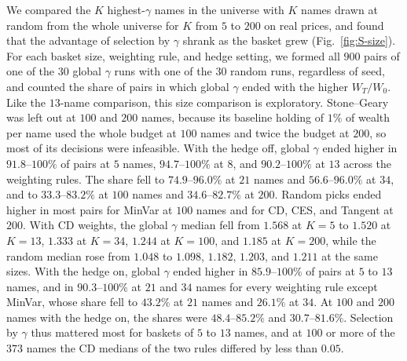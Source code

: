 We compared the $K$ highest-$\gamma$ names in the universe with $K$ names drawn at random from the whole universe
for $K$ from $5$ to $200$ on real prices, and found that the advantage of selection by $\gamma$ shrank as the basket
grew (Fig.~\ref{fig:S-size}). For each basket size, weighting rule, and hedge setting, we formed all $900$ pairs of
one of the $30$ global $\gamma$ runs with one of the $30$ random runs, regardless of seed, and counted the share of
pairs in which global $\gamma$ ended with the higher $W_T/W_0$. Like the $13$-name comparison, this size comparison
is exploratory.
Stone--Geary was left out at $100$ and $200$ names, because its baseline holding of $1\%$ of wealth per name used the
whole budget at $100$ names and twice the budget at $200$, so most of its decisions were infeasible.
With the hedge off, global $\gamma$ ended higher in $91.8$--$100\%$ of pairs at $5$ names, $94.7$--$100\%$ at $8$, and
$90.2$--$100\%$ at $13$ across the weighting rules. The share fell to $74.9$--$96.0\%$ at $21$ names and
$56.6$--$96.0\%$ at $34$, and to $33.3$--$83.2\%$ at $100$ names and $34.6$--$82.7\%$ at $200$. Random picks ended
higher in most pairs for MinVar at $100$ names and for CD, CES, and Tangent at $200$.
With CD weights, the global $\gamma$ median fell from $1.568$ at $K = 5$ to $1.520$ at $K = 13$, $1.333$ at
$K = 34$, $1.244$ at $K = 100$, and $1.185$ at $K = 200$, while the random median rose from $1.048$ to $1.098$,
$1.182$, $1.203$, and $1.211$ at the same sizes.
With the hedge on, global $\gamma$ ended higher in $85.9$--$100\%$ of pairs at $5$ to $13$ names, and in
$90.3$--$100\%$ at $21$ and $34$ names for every weighting rule except MinVar, whose share fell to $43.2\%$ at
$21$ names and $26.1\%$ at $34$. At $100$ and $200$ names with the hedge on, the shares were $48.4$--$85.2\%$ and
$30.7$--$81.6\%$. Selection by $\gamma$ thus mattered most for baskets of $5$ to $13$ names, and at $100$ or more of
the $373$ names the CD medians of the two rules differed by less than $0.05$.

